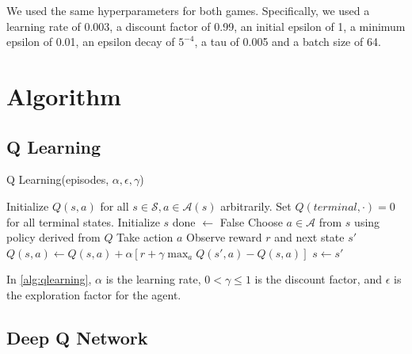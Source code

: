 \documentclass{article}
\begin{document}
We used the same hyperparameters for both games. Specifically, we used a
learning rate of 0.003, a discount factor of 0.99, an initial epsilon of 1, a
minimum epsilon of 0.01, an epsilon decay of \(5^{-4}\), a tau of 0.005 and a
batch size of 64.

\section{Algorithm}

\subsection{Q Learning}

\begin{algorithm}[H]
      \caption{Q Learning(episodes, \(\alpha, \epsilon, \gamma\))}
      \label{alg:qlearning}
      \begin{algorithmic}[1]
            \State Initialize \(Q(s,a)\) for all \(s \in \mathcal{S}, a \in \mathcal{A}(s)\) arbitrarily.
            \State Set \(Q(terminal, \cdot) = 0 \) for all terminal states.
            \State Initialize \(s\)
            \State done \(\leftarrow\) False
            \State Choose \(a \in \mathcal{A}\) from \(s\) using policy derived from \(Q\) 
            \State Take action \(a\)
            \State Observe reward \(r\) and next state \(s'\)
            \State \(Q(s, a) \leftarrow Q(s, a) + \alpha \left[r + \gamma \max_{a} Q(s', a) - Q(s, a)\right]\) 
            \State \(s \leftarrow s'\)
            \EndWhile
            \EndFor
      \end{algorithmic}
\end{algorithm}

In \cref{alg:qlearning}, \(\alpha\) is the learning rate, \(0 < \gamma \leq 1\)
is the discount factor, and \(\epsilon\) is the exploration factor for the
agent.

\subsection{Deep Q Network}
\end{document}
